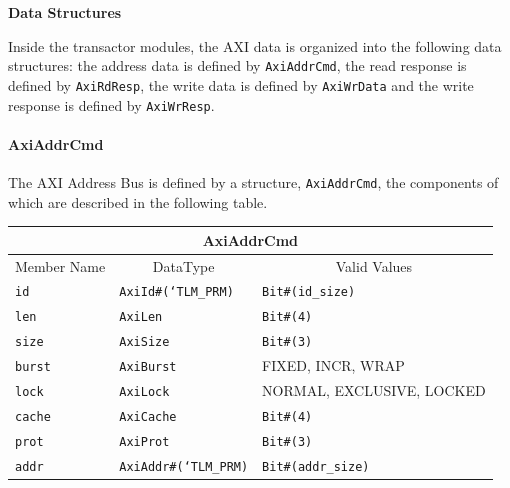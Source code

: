 \documentclass[twoside,letterpaper]{article}
\newcommand{\te}[1]{\texttt{#1}}
\begin{document}
{\bf Data Structures}

Inside the transactor modules, the AXI data is organized into the
following data structures: the address data is defined by
\te{AxiAddrCmd}, the read response is defined by \te{AxiRdResp}, the
write data is defined by \te{AxiWrData} and the write response is
defined by \te{AxiWrResp}.

\paragraph{\bf AxiAddrCmd} The AXI Address Bus is defined by a structure, \te{AxiAddrCmd}, the
components of which are described in the following table.

\begin{center}
\begin{tabular}{|p{1 in}|p{1.8in}|p{3.2 in}|}
\hline
\multicolumn{3}{|c|}{AxiAddrCmd} \\
\hline
\multicolumn{1}{|c|}{Member Name}&\multicolumn{1}{|c|}{DataType}&\multicolumn{1}{|c|}{Valid Values} \\
\hline
\hline
\te{id}&\te{AxiId\#(`TLM\_PRM)}&\te{Bit\#(id\_size)}\\
\hline
\te{len}&\te{AxiLen}&\te{Bit\#(4)}\\
\hline
\te{size}&\te{AxiSize}  &\te{Bit\#(3)}\\
\hline
\te{burst}&\te{AxiBurst}&FIXED, INCR, WRAP\\
\hline
\te{lock}&\te{AxiLock}&NORMAL, EXCLUSIVE, LOCKED\\
\hline
\te{cache}&\te{AxiCache}&\te{Bit\#(4)}\\
\hline
\te{prot}&\te{AxiProt}&\te{Bit\#(3)}\\
\hline
\te{addr}&\te{AxiAddr\#(`TLM\_PRM)}&\te{Bit\#(addr\_size)}\\
\hline
\end{tabular}
\end{center}

\end{document}
